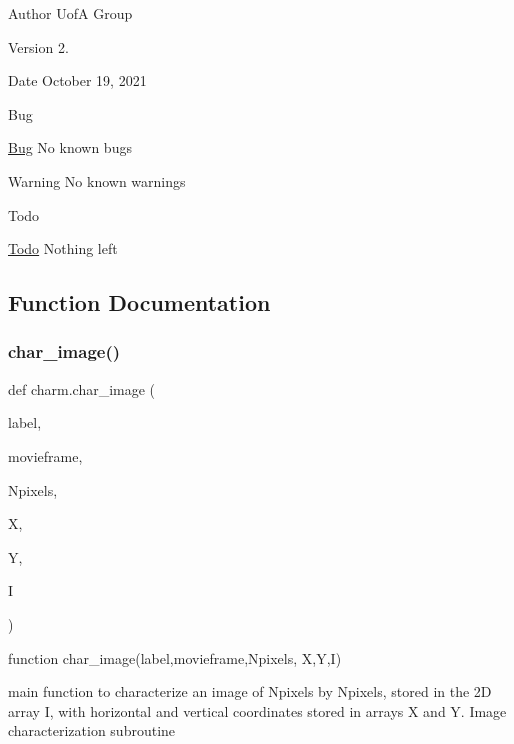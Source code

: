 \begin{DoxyAuthor}{Author}
UofA Group
\end{DoxyAuthor}
\begin{DoxyVersion}{Version}
2.
\end{DoxyVersion}
\begin{DoxyDate}{Date}
October 19, 2021
\end{DoxyDate}
\begin{DoxyRefDesc}{Bug}
\item[\mbox{\hyperlink{bug__bug000001}{Bug}}]No known bugs\end{DoxyRefDesc}


\begin{DoxyWarning}{Warning}
No known warnings
\end{DoxyWarning}
\begin{DoxyRefDesc}{Todo}
\item[\mbox{\hyperlink{todo__todo000001}{Todo}}]Nothing left \end{DoxyRefDesc}


\subsection{Function Documentation}
\mbox{\label{namespacecharm_af661e8a1e79e9d287bbd932dfb08ad61}} 
\subsubsection{\texorpdfstring{char\_image()}{char\_image()}}
{\footnotesize\ttfamily def charm.\+char\+\_\+image (\begin{DoxyParamCaption}\item[{}]{label,  }\item[{}]{movieframe,  }\item[{}]{Npixels,  }\item[{}]{X,  }\item[{}]{Y,  }\item[{}]{I }\end{DoxyParamCaption})}



function char\+\_\+image(label,movieframe,\+Npixels, X,\+Y,\+I) 

main function to characterize an image of Npixels by Npixels, stored in the 2D array I, with horizontal and vertical coordinates stored in arrays X and Y. Image characterization subroutine

